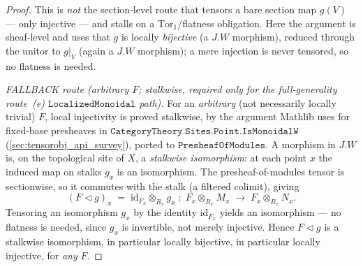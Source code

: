 \begin{proof}
  This is \emph{not} the section-level route that tensors a bare section map \(g(V)\)
  --- only injective --- and stalls on a \(\mathrm{Tor}_1\)/flatness obligation. Here
  the argument is sheaf-level and uses that \(g\) is locally \emph{bijective} (a
  \(J.W\) morphism), reduced through the unitor to \(g|_V\) (again a \(J.W\)
  morphism); a mere injection is never tensored, so no flatness is needed.

  \emph{FALLBACK route (arbitrary \(F\); stalkwise, required only for the
  full-generality route~(e) \(\mathtt{LocalizedMonoidal}\) path).} For an
  \emph{arbitrary} (not necessarily locally trivial) \(F\), local injectivity is
  proved stalkwise, by the argument Mathlib uses for fixed-base presheaves in
  \(\mathtt{CategoryTheory.Sites.Point.IsMonoidalW}\)
  (\cref{sec:tensorobj_api_survey}), ported to \(\mathtt{PresheafOfModules}\). A
  morphism in \(J.W\) is, on the topological site of \(X\), a \emph{stalkwise
  isomorphism}: at each point \(x\) the induced map on stalks \(g_x\) is an
  isomorphism. The presheaf-of-modules tensor is sectionwise, so it commutes with
  the stalk (a filtered colimit), giving
  \[
    (F \triangleleft g)_x
      \;=\; \mathrm{id}_{F_x} \otimes_{R_x} g_x
      \;\colon\; F_x \otimes_{R_x} M_x \;\longrightarrow\; F_x \otimes_{R_x} N_x .
  \]
  Tensoring an isomorphism \(g_x\) by the identity \(\mathrm{id}_{F_x}\) yields an
  isomorphism --- no flatness is needed, since \(g_x\) is invertible, not merely
  injective. Hence \(F \triangleleft g\) is a stalkwise isomorphism, in particular
  locally bijective, in particular locally injective, for \emph{any} \(F\).


\end{proof}
